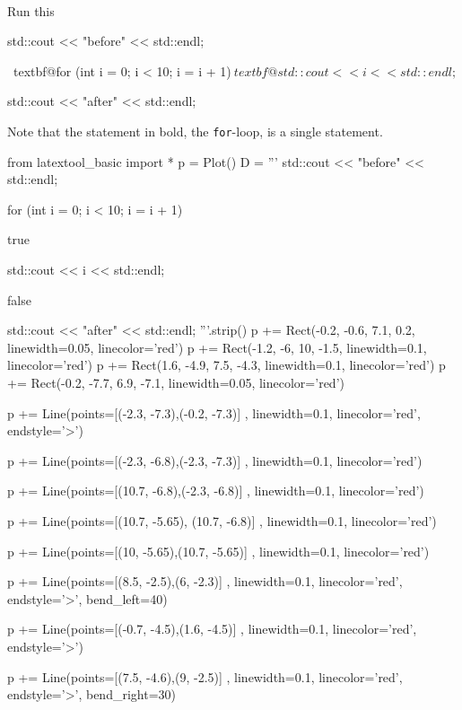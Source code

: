\newpage{}\\

\begin{ex}
Run this
\begin{console}[commandchars=\~\@\$]
std::cout << "before" << std::endl;

~textbf@for (int i = 0; i < 10; i = i + 1)$
    ~textbf@std::cout << i << std::endl;$
    
std::cout << "after" << std::endl;
\end{console}
\end{ex}

Note that the statement in bold, the \texttt{for}-loop, is a single
statement.
\begin{python}
from latextool_basic import *
p = Plot()
D = '''
std::cout << "before" << std::endl;




for (int i = 0;        i < 10;        i = i + 1)



true

         std::cout << i << std::endl;

false




std::cout << "after" << std::endl;
'''.strip()
p += Rect(-0.2, -0.6, 7.1, 0.2, linewidth=0.05, linecolor='red')
p += Rect(-1.2, -6, 10, -1.5, linewidth=0.1, linecolor='red')
p += Rect(1.6, -4.9, 7.5, -4.3, linewidth=0.1, linecolor='red')
p += Rect(-0.2, -7.7, 6.9, -7.1, linewidth=0.05, linecolor='red')


p += Line(points=[(-2.3, -7.3),(-0.2, -7.3)] , linewidth=0.1, linecolor='red', endstyle='>')

p += Line(points=[(-2.3, -6.8),(-2.3, -7.3)] , linewidth=0.1, linecolor='red')

p += Line(points=[(10.7, -6.8),(-2.3, -6.8)] , linewidth=0.1, linecolor='red')

p += Line(points=[(10.7, -5.65), (10.7, -6.8)] , linewidth=0.1, linecolor='red')

p += Line(points=[(10, -5.65),(10.7, -5.65)] , linewidth=0.1, linecolor='red')

p += Line(points=[(8.5, -2.5),(6, -2.3)] , linewidth=0.1, linecolor='red', endstyle='>', bend_left=40)

p += Line(points=[(-0.7, -4.5),(1.6, -4.5)] , linewidth=0.1, linecolor='red', endstyle='>')

p += Line(points=[(7.5, -4.6),(9, -2.5)] , linewidth=0.1, linecolor='red', endstyle='>', bend_right=30)


\end{python}

